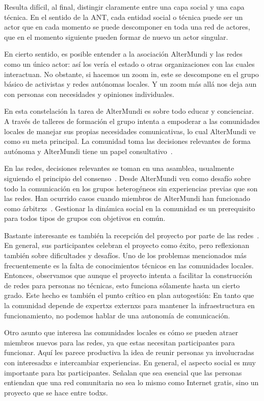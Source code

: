 Resulta difícil, al final, distingir claramente entre una capa social y una capa técnica.
En el sentido de la ANT, cada entidad social o técnica puede ser un actor que en cada momento se puede descomponer en toda una red de actores, que en el momento siguiente pueden formar de nuevo un actor singular.

En cierto sentido, es posible entender a la asociación AlterMundi y las redes como un único actor: así los vería el estado o otras organizaciones con las cuales interactuan.
No obstante, si hacemos un zoom in, este se descompone en el grupo básico de activistas y redes autónomas locales.
Y un zoom más allá nos deja aun con personas con necesidades y opiniones individuales.

En esta constelación la tarea de AlterMundi es sobre todo educar y concienciar.
A través de talleres de formación el grupo intenta a empoderar a las comunidades locales de manejar sus propias necesidades comunicativas, lo cual AlterMundi ve como su meta principal.
La comunidad toma las decisiones relevantes de forma autónoma y AlterMundi tiene un papel consultativo~\autocite{Vaseva2016a}.

En las redes, decisiones relevantes se toman en una asamblea, usualmente siguiendo el principio del consenso~\autocite{Vaseva2016a}.
Desde AlterMundi ven como desafío sobre todo la comunicación en los grupos heterogéneos sin experiencias previas que son las redes.
Han ocurrido casos cuando miembros de AlterMundi han funcionado como árbitrxs~\autocite{Vaseva2016a}.
Gestionar la dinámica social en la comunidad es un prerequisito para todos tipos de grupos con objetivos en común.

Bastante interesante es también la recepción del proyecto por parte de las redes~\autocite{AlterMundi2017}.
En general, sus participantes celebran el proyecto como éxito, pero reflexionan también sobre dificultades y desafíos.
Uno de los problemas mencionados más frecuentemente es la falta de conocimientos técnicos en las comunidades locales.
Entonces, observamos que aunque el proyecto intenta a facilitar la construcción de redes para personas no técnicas, esto funciona sólamente hasta un cierto grado.
Este hecho es también el punto crítico en plan autogestión:
En tanto que la comunidad depende de expertxs externxs para mantener la infraestructura en funcionamiento, no podemos hablar de una autonomía de comunicación.

Otro asunto que interesa las comunidades locales es cómo se pueden atraer miembros nuevos para las redes, ya que estas necesitan participantes para funcionar.
Aquí les parece productiva la idea de reunir personas ya involucradas con interesadxs e intercambiar experiencias.
En general, el aspecto social es muy importante para lxs participantes.
Señalan que sea esencial que las personas entiendan que una red comunitaria no sea lo mismo como Internet gratis, sino un proyecto que se hace entre todxs.

